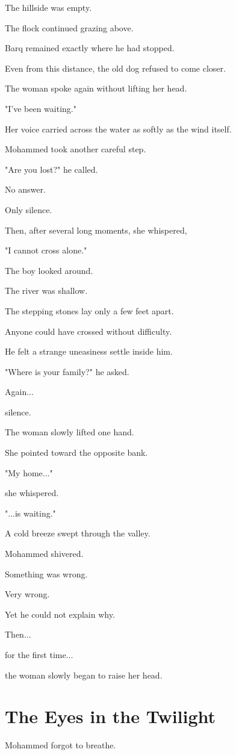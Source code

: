\documentclass[12pt,openany]{book}
\begin{document}
The hillside was empty.

The flock continued grazing above.

Barq remained exactly where he had stopped.

Even from this distance, the old dog refused to come closer.

The woman spoke again without lifting her head.

"I've been waiting."

Her voice carried across the water as softly as the wind itself.

Mohammed took another careful step.

"Are you lost?" he called.

No answer.

Only silence.

Then, after several long moments, she whispered,

"I cannot cross alone."

The boy looked around.

The river was shallow.

The stepping stones lay only a few feet apart.

Anyone could have crossed without difficulty.

He felt a strange uneasiness settle inside him.

"Where is your family?" he asked.

Again...

silence.

The woman slowly lifted one hand.

She pointed toward the opposite bank.

"My home..."

she whispered.

"...is waiting."

A cold breeze swept through the valley.

Mohammed shivered.

Something was wrong.

Very wrong.

Yet he could not explain why.

Then...

for the first time...

the woman slowly began to raise her head.
\section*{The Eyes in the Twilight}

Mohammed forgot to breathe.
\end{document}

